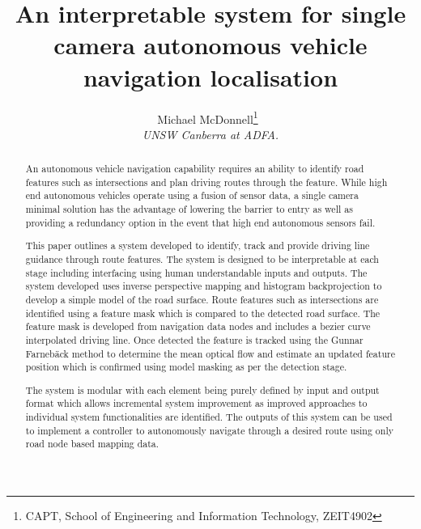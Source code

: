 \documentclass[]{aiaa-tc}%
\title{An interpretable system for single camera autonomous vehicle navigation localisation}
\author{
  Michael McDonnell\thanks{CAPT, School of Engineering and Information Technology, ZEIT4902}\
  \\
  {\normalsize\itshape
   UNSW Canberra at ADFA.}\\
  }
\begin{document}
\maketitle


\begin{abstract}

An autonomous vehicle navigation capability requires an ability to identify road features such as intersections and plan driving routes through the feature. While high end autonomous vehicles operate using a fusion of sensor data, a single camera minimal solution has the advantage of lowering the barrier to entry as well as providing a redundancy option in the event that high end autonomous sensors fail.

This paper outlines a system developed to identify, track and provide driving line guidance through route features. The system is designed to be interpretable at each stage including interfacing using human understandable inputs and outputs. The system developed uses inverse perspective mapping and histogram backprojection to develop a simple model of the road surface. Route features such as intersections are identified using a feature mask which is compared to the detected road surface. The feature mask is developed from navigation data nodes and includes a bezier curve interpolated driving line. Once detected the feature is tracked using the Gunnar Farneb{\"a}ck method to determine the mean optical flow and estimate an updated feature position which is confirmed using model masking as per the detection stage.

The system is modular with each element being purely defined by input and output format which allows incremental system improvement as improved approaches to individual system functionalities are identified. The outputs of this system can be used to implement a controller to autonomously navigate through a desired route using only road node based mapping data.

\end{abstract}
%
%
%
%
%
\end{document}
